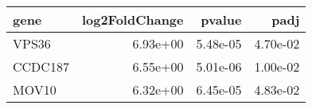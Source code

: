 \begin{tabular}{lrrr}
\toprule
   gene &  log2FoldChange &   pvalue &     padj \\
\midrule
  VPS36 &        6.93e+00 & 5.48e-05 & 4.70e-02 \\
CCDC187 &        6.55e+00 & 5.01e-06 & 1.00e-02 \\
  MOV10 &        6.32e+00 & 6.45e-05 & 4.83e-02 \\
\bottomrule
\end{tabular}
